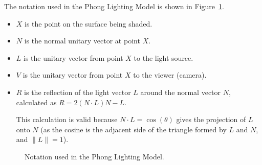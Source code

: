 \begin{notacion}
The notation used in the Phong Lighting Model is shown in Figure~\ref{fig:phong-notation}.
\begin{itemize}
    \item $X$ is the point on the surface being shaded.
    \item $N$ is the normal unitary vector at point $X$.
    \item $L$ is the unitary vector from point $X$ to the light source.
    \item $V$ is the unitary vector from point $X$ to the viewer (camera).
    \item $R$ is the reflection of the light vector $L$ around the normal vector $N$, calculated as $R = 2(N \cdot L)N - L$.
    
    This calculation is valid because $N\cdot L=\cos (\theta)$ gives the projection of $L$ onto $N$ (as the cosine is the adjacent side of the triangle formed by $L$ and $N$, and $\|L\|=1$).
\end{itemize}
\begin{figure}
    \centering
    \caption{Notation used in the Phong Lighting Model.}
    \label{fig:phong-notation}
\end{figure}
\end{notacion}
